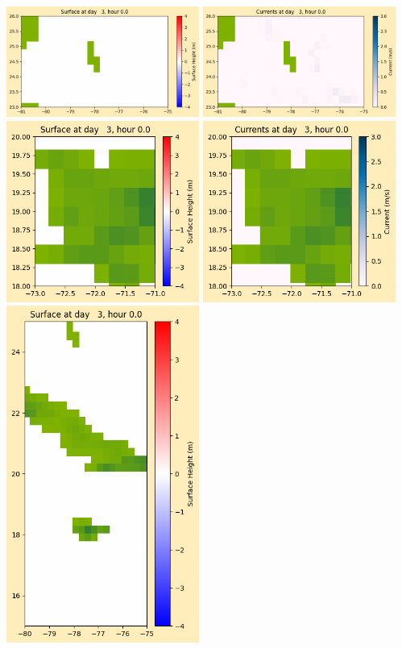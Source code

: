 \documentclass[11pt]{article}
\begin{document}
\vskip 10pt 
\includegraphics[width=0.475\textwidth]{frame0024fig1003.png}
\includegraphics[width=0.475\textwidth]{frame0024fig1004.png}
\vskip 10pt 
\includegraphics[width=0.475\textwidth]{frame0024fig1005.png}
\includegraphics[width=0.475\textwidth]{frame0024fig1006.png}
\vskip 10pt 
\includegraphics[width=0.475\textwidth]{frame0024fig1007.png}
\end{document}
